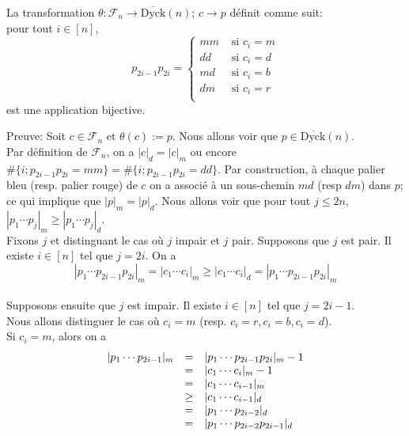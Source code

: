 \begin{proposition} \label{bij-DyckBar}
	La transformation $\theta: \mathcal{F}_{n} \longrightarrow  \overline{\text{Dyck}}(n)$; $c \longrightarrow p$ définit comme suit:\\pour tout $i \in [n]$,
	$$
		p_{2i-1}p_{2i}=\begin{cases}
			mm & \text{ si } c_{i}=m \\
			dd & \text{ si } c_{i}=d \\
			md & \text{ si } c_{i}=b \\
			dm & \text{ si } c_{i}=r \\
		\end{cases}
	$$
	est une application bijective.
\end{proposition}
Preuve: Soit $c\in \mathcal{F}_{n}$ et $\theta(c):=p$.
Nous allons voir que $p\in \overline{\text{Dyck}}(n) $.\\
Par définition de $\mathcal{F}_{n}$, on a $|c|_{d}=|c|_{m}$ ou encore $\#\{i; p_{2i-1}p_{2i}=mm\}=\#\{i; p_{2i-1}p_{2i}=dd\}$. Par construction, à chaque palier
bleu (resp. palier rouge) de $c$ on a associé à un sous-chemin $md$ (resp $dm$) dans $p$; ce qui implique que $|p|_{m}=|p|_{d}$. Nous allons voir que pour tout $j\leq 2n$, $|p_{1} \cdots p_{j}|_{m}\geq |p_{1} \cdots p_{j}|_{d}$.\\
Fixons $j$ et distinguant le cas où $j$ impair et $j$ pair. Supposons que $j$ est pair. Il existe $i\in [n]$ tel que $j=2i$. On a \vspace{5pt}\\
\[
	|p_{1} \cdots p_{2i-1}p_{2i}|_{m} = |c_{1} \cdots c_{i}|_{m}\geq |c_{1} \cdots c_{i}|_{d} = |p_{1} \cdots p_{2i-1}p_{2i}|_{m}
\]
\text{}\vspace{5pt}\\
Supposons ensuite que $j$ est impair. Il existe $i\in [n]$ tel que $j = 2i-1$.\\ Nous allons distinguer le cas où $c_{i} = m$ (resp. $c_{i}=r, c_{i}=b, c_{i}=d$).\\
Si $c_{i}=m$, alors on a \vspace{5pt}\\
\[
	\begin{array} {l l l}
		| p_{1}\cdots p_{2i-1} |_{m} & =    & | p_{1}\cdots p_{2i-1}p_{2i} |_{m} -1 \\
		                             & =    & | c_{1}\cdots c_{i} |_{m} -1          \\
		                             & =    & | c_{1}\cdots c_{i-1} |_{m}           \\
		                             & \geq & | c_{1}\cdots c_{i-1} |_{d}           \\
		                             & =    & | p_{1}\cdots p_{2i-2} |_{d}          \\
		                             & =    & | p_{1}\cdots p_{2i-2}p_{2i-1} |_{d}
	\end{array}
\]
